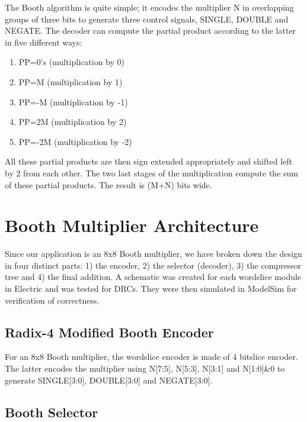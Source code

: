 \documentclass[conference]{IEEEtran}
\begin{document}
The Booth algorithm is quite simple; it encodes the multiplier N in overlapping groups of
three bits to generate three control signals, SINGLE, DOUBLE and NEGATE. The decoder can
compute the partial product according to the latter in five different ways:

\begin{enumerate}
\item PP=0's (multiplication by 0)
\item PP=M (multiplication by 1)
\item PP=-M (multiplication by -1)
\item PP=2M (multiplication by 2)
\item PP=-2M (multiplication by -2)
\end{enumerate}


All these partial products are then sign extended appropriately and shifted left by 2 from
each other. The two last stages of the multiplication compute the sum of these partial products.
The result is (M+N) bits wide.




\section{Booth Multiplier Architecture}

Since our application is an 8x8 Booth multiplier, we have broken down the design in four
distinct parts: 1) the encoder, 2) the selector (decoder), 3) the compressor tree and 4) the final
addition. A schematic was created for each wordslice module in Electric and was tested for
DRCs. They were then simulated in ModelSim for verification of correctness.


\subsection{Radix-4 Modified Booth Encoder}

For an 8x8 Booth multiplier, the wordslice encoder is made of 4 bitslice encoder. The
latter encodes the multiplier using N[7:5], N[5:3], N[3:1] and N[1:0]\&0 to generate SINGLE[3:0],
DOUBLE[3:0] and NEGATE[3:0].



\subsection{Booth Selector}
\end{document}
